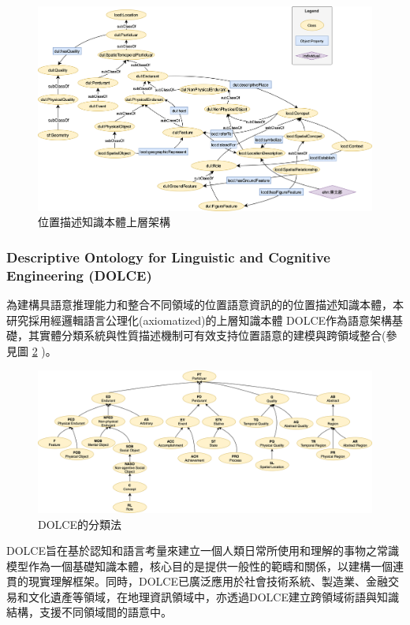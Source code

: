 \begin{figure}[!htbp]
\centering
\includegraphics[width = \textwidth]{figures/LocD_top_level.png}
\caption{位置描述知識本體上層架構}
\label{fig:locd_top}
\end{figure}

\subsubsection{Descriptive Ontology for Linguistic and Cognitive Engineering (DOLCE)}

為建構具語意推理能力和整合不同領域的位置語意資訊的的位置描述知識本體，本研究採用經邏輯語言公理化(axiomatized)的上層知識本體 DOLCE作為語意架構基礎，其實體分類系統與性質描述機制可有效支持位置語意的建模與跨領域整合(參見圖 \ref{fig:dolce} )。

\begin{figure}[!htbp]
\centering
\includegraphics[width = \textwidth]{figures/dolce.png}
\caption{DOLCE的分類法}
\label{fig:dolce}
\end{figure}

DOLCE旨在基於認知和語言考量來建立一個人類日常所使用和理解的事物之常識模型作為一個基礎知識本體，核心目的是提供一般性的範疇和關係，以建構一個連貫的現實理解框架\citep{RN86}。同時，DOLCE已廣泛應用於社會技術系統、製造業、金融交易和文化遺產等領域，在地理資訊領域中，亦透過DOLCE建立跨領域術語與知識結構，支援不同領域間的語意中\citep{RN195, RN193}。

